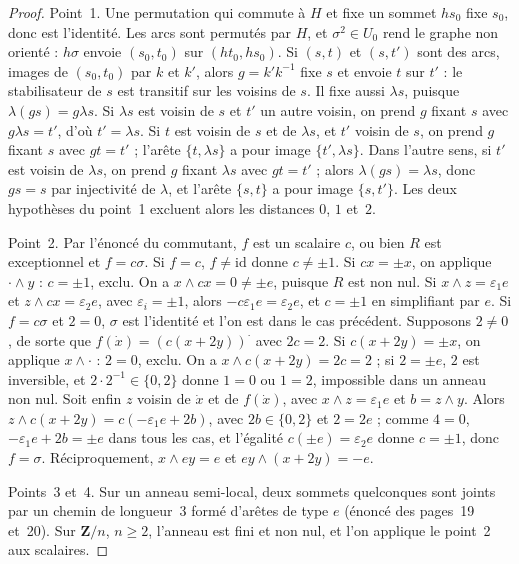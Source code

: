\begin{proof}
Point~1. Une permutation qui commute à $H$ et fixe un sommet $hs_0$ fixe $s_0$, donc est l'identité. Les arcs sont permutés par $H$, et $\sigma^2 \in U_0$ rend le graphe non orienté : $h\sigma$ envoie $(s_0, t_0)$ sur $(ht_0, hs_0)$. Si $(s, t)$ et $(s, t')$ sont des arcs, images de $(s_0, t_0)$ par $k$ et $k'$, alors $g = k'k^{-1}$ fixe $s$ et envoie $t$ sur $t'$ : le stabilisateur de $s$ est transitif sur les voisins de $s$. Il fixe aussi $\lambda s$, puisque $\lambda(gs) = g\lambda s$. Si $\lambda s$ est voisin de $s$ et $t'$ un autre voisin, on prend $g$ fixant $s$ avec $g\lambda s = t'$, d'où $t' = \lambda s$. Si $t$ est voisin de $s$ et de $\lambda s$, et $t'$ voisin de $s$, on prend $g$ fixant $s$ avec $gt = t'$ ; l'arête $\{t, \lambda s\}$ a pour image $\{t', \lambda s\}$. Dans l'autre sens, si $t'$ est voisin de $\lambda s$, on prend $g$ fixant $\lambda s$ avec $gt = t'$ ; alors $\lambda(gs) = \lambda s$, donc $gs = s$ par injectivité de $\lambda$, et l'arête $\{s, t\}$ a pour image $\{s, t'\}$. Les deux hypothèses du point~1 excluent alors les distances $0$, $1$ et~$2$.

Point~2. Par l'énoncé du commutant, $f$ est un scalaire $c$, ou bien $R$ est exceptionnel et $f = c\sigma$. Si $f = c$, $f \neq \mathrm{id}$ donne $c \neq \pm 1$. Si $cx = \pm x$, on applique $\cdot \wedge y$ : $c = \pm 1$, exclu. On a $x \wedge cx = 0 \neq \pm e$, puisque $R$ est non nul. Si $x \wedge z = \varepsilon_1 e$ et $z \wedge cx = \varepsilon_2 e$, avec $\varepsilon_i = \pm 1$, alors $-c\varepsilon_1 e = \varepsilon_2 e$, et $c = \pm 1$ en simplifiant par $e$. Si $f = c\sigma$ et $2 = 0$, $\sigma$ est l'identité et l'on est dans le cas précédent. Supposons $2 \neq 0$, de sorte que $f(\dot x) = (c(x + 2y))^{\cdot}$ avec $2c = 2$. Si $c(x + 2y) = \pm x$, on applique $x \wedge \cdot$ : $2 = 0$, exclu. On a $x \wedge c(x + 2y) = 2c = 2$ ; si $2 = \pm e$, $2$ est inversible, et $2 \cdot 2^{-1} \in \{0, 2\}$ donne $1 = 0$ ou $1 = 2$, impossible dans un anneau non nul. Soit enfin $z$ voisin de $\dot x$ et de $f(\dot x)$, avec $x \wedge z = \varepsilon_1 e$ et $b = z \wedge y$. Alors $z \wedge c(x + 2y) = c(-\varepsilon_1 e + 2b)$, avec $2b \in \{0, 2\}$ et $2 = 2e$ ; comme $4 = 0$, $-\varepsilon_1 e + 2b = \pm e$ dans tous les cas, et l'égalité $c(\pm e) = \varepsilon_2 e$ donne $c = \pm 1$, donc $f = \sigma$. Réciproquement, $x \wedge ey = e$ et $ey \wedge (x + 2y) = -e$.

Points~3 et~4. Sur un anneau semi-local, deux sommets quelconques sont joints par un chemin de longueur~$3$ formé d'arêtes de type $e$ (énoncé des pages~19 et~20). Sur $\mathbf Z/n$, $n \geq 2$, l'anneau est fini et non nul, et l'on applique le point~2 aux scalaires.
\end{proof}

